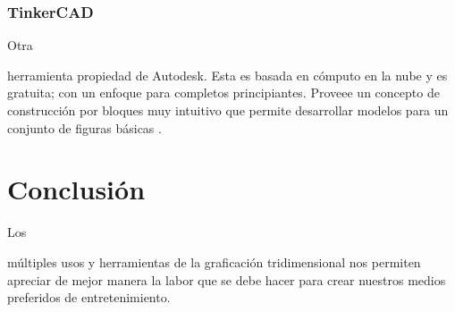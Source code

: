 \documentclass[stu, 12pt, letterpaper, donotrepeattitle, floatsintext, natbib]{apa7}
\begin{document}
    \subsubsection{TinkerCAD}
    Otra \begin{justifying}
        herramienta propiedad de Autodesk. Esta es basada en cómputo en la nube y es gratuita; con un enfoque para completos principiantes. Proveee un concepto de construcción por bloques muy intuitivo
        que permite desarrollar modelos para un conjunto de figuras básicas \citep{p-2021}. %
        \par
    \end{justifying}
    \vspace{\baselineskip}
    \section{Conclusión}
    Los \begin{justifying}
        múltiples usos y herramientas de la graficación tridimensional nos permiten apreciar de mejor manera la labor que se debe hacer para crear
        nuestros medios preferidos de entretenimiento.\par
    \end{justifying}
    
    \newpage   
    \renewcommand\refname{\textbf{Referencias}}
    
    
\end{document}
